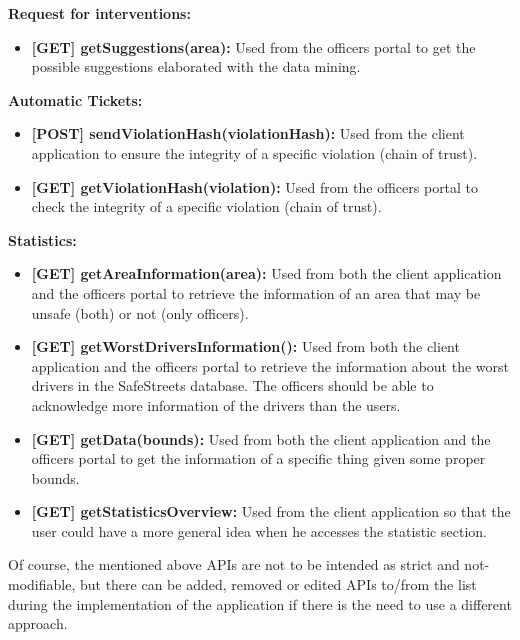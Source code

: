\textbf{Request for interventions:}
\begin{itemize}
	\item \textbf{[GET] getSuggestions(area):} Used from the officers portal to get the possible suggestions elaborated with the data mining.
\end{itemize}

\textbf{Automatic Tickets:}
\begin{itemize}
	\item \textbf{[POST] sendViolationHash(violationHash):}  Used from the client application to ensure the integrity of a specific violation (chain of trust). 
	\item \textbf{[GET] getViolationHash(violation):}  Used from the officers portal to check the integrity of a specific violation (chain of trust). 
\end{itemize}

\textbf{Statistics:}
\begin{itemize}
	\item \textbf{[GET] getAreaInformation(area):} Used from both the client application and the officers portal to retrieve the information of an area that may be unsafe (both) or not (only officers).
	\item \textbf{[GET] getWorstDriversInformation():} Used from both the client application and the officers portal to retrieve the information about the worst drivers in the SafeStreets database. The officers should be able to acknowledge more information of the drivers than the users.
	\item \textbf{[GET] getData(bounds):} Used from both the client application and the officers portal to get the information of a specific thing given some proper bounds.
	\item \textbf{[GET] getStatisticsOverview:} Used from the client application so that the user could have a more general idea when he accesses the statistic section.
\end{itemize}

Of course, the mentioned above APIs are not to be intended as strict and not-modifiable, but there can be added, removed or edited APIs to/from the list during the implementation of the application if there is the need to use a different approach.
